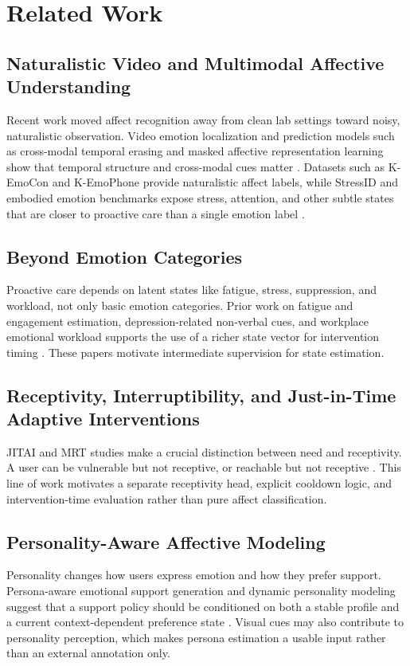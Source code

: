 \section{Related Work}

\subsection{Naturalistic Video and Multimodal Affective Understanding}
Recent work moved affect recognition away from clean lab settings toward noisy, naturalistic observation. Video emotion localization and prediction models such as cross-modal temporal erasing and masked affective representation learning show that temporal structure and cross-modal cues matter \cite{wsvd2023,mart2024}. Datasets such as K-EmoCon and K-EmoPhone provide naturalistic affect labels, while StressID and embodied emotion benchmarks expose stress, attention, and other subtle states that are closer to proactive care than a single emotion label \cite{kemocon2020,kemophone2023,stressid2023,e3_2024}.

\subsection{Beyond Emotion Categories}
Proactive care depends on latent states like fatigue, stress, suppression, and workload, not only basic emotion categories. Prior work on fatigue and engagement estimation, depression-related non-verbal cues, and workplace emotional workload supports the use of a richer state vector for intervention timing \cite{fatigue2024,depressionframes2024,emowork2026}. These papers motivate intermediate supervision for state estimation.

\subsection{Receptivity, Interruptibility, and Just-in-Time Adaptive Interventions}
JITAI and MRT studies make a crucial distinction between need and receptivity. A user can be vulnerable but not receptive, or reachable but not receptive \cite{mrt2022,mrt2023,jmir2021,engagementmrt2022}. This line of work motivates a separate receptivity head, explicit cooldown logic, and intervention-time evaluation rather than pure affect classification.

\subsection{Personality-Aware Affective Modeling}
Personality changes how users express emotion and how they prefer support. Persona-aware emotional support generation and dynamic personality modeling suggest that a support policy should be conditioned on both a stable profile and a current context-dependent preference state \cite{pal2023,dynamicpersonality2024,traitsempathy2025,personatalks2025,mpdd2025}. Visual cues may also contribute to personality perception, which makes persona estimation a usable input rather than an external annotation only.

